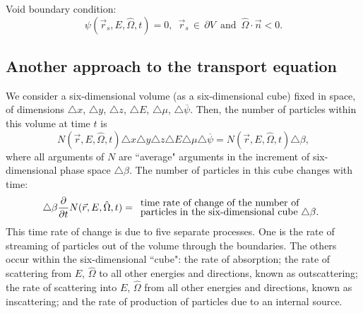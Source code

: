 \documentclass[12pt]{article}
\newcommand{\rvec}{\ensuremath{\vec{r}}}
\newcommand{\omvec}{\ensuremath{\hat{\Omega}}}
\begin{document}
Void boundary condition:
\[
\psi(\rvec_s, E, \omvec, t) = 0, \,\,\, \rvec_s \, \in \, \partial V \,\,\, \text{and} \,\,\, \omvec \cdot \vec{n} <0.
\]

\subsection*{Another approach to the transport equation}


We consider a six-dimensional volume (as a six-dimensional cube)
 fixed in space, of dimensions
$\triangle x$, $\triangle y$, $\triangle z$, $\triangle E$, $\triangle \mu$, $\triangle \overline\psi$.
Then, the number of particles within this volume at time $t$ is
\begin{equation*}
N(\rvec,E,\omvec,t)\triangle x\triangle y\triangle z\triangle E\triangle \mu\triangle \overline\psi =
N(\rvec,E,\omvec,t)\triangle \beta,
\end{equation*}
where all arguments of $N$ are ``average" arguments in the %
increment of six-dimensional phase space $\triangle \beta$.
The number of
particles in this cube changes with time:
\begin{equation*}
\triangle \beta\frac{\partial}{\partial t}N(\rvec,E,\omvec,t) = \begin{array}{l}
\text{time rate of change of the number of}\vspace{-0.1cm}\\
\text{particles in the six-dimensional cube $\triangle \beta$.}
\end{array}
\end{equation*}
 This time rate of change is due to five separate processes. One is the rate of streaming of
particles out of the volume through the boundaries. The others occur within the
six-dimensional ``cube": the rate
of absorption; the rate of scattering from $E$, $\omvec$ to all other energies and directions, known
as outscattering; the rate of scattering into $E$, $\omvec$ from all other energies and
 directions, known as inscattering; and the rate of production of particles due to an internal source.
\end{document}
